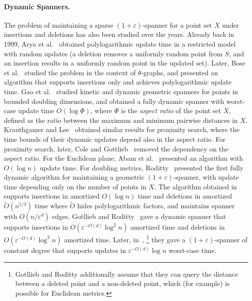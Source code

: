 \documentclass[11pt]{article}
\let\e\varepsilon               %
\def\EMPH#1{\emph{\textcolor{BrickRed} {#1}}}
\newcommand{\ddim}{\ensuremath{d}}
\begin{document}
\paragraph{Dynamic Spanners.} The problem of maintaining a sparse $(1+\e)$-spanner for a point set $X$ under insertions and deletions has also been studied over the years. Already back in 1999, Arya et al.~\cite{arya1999dynamic} obtained polylogarithmic update time in a restricted model with random updates
(a deletion removes a uniformly random point from $S$, and an insertion results in a uniformly random point in the updated set).
Later, Bose et al.~\cite{bose2004ordered} studied the problem in the context of $\theta$-graphs, and presented an algorithm that supports insertions only and achieves polylogarithmic update time. 
Gao et al.~\cite{gao2004deformable} studied kinetic and dynamic geometric spanners for points in bounded doubling dimensions, and obtained a fully dynamic spanner 
with worst-case update time $O(\log \Phi)$, where $\Phi$ is the 
\EMPH{aspect ratio} of the point set $X$, defined as the ratio between the maximum and minimum pairwise distances in $X$. Krauthgamer and Lee~\cite{KL04} obtained similar results for proximity search, where the time bounds of their dynamic updates depend also in the aspect ratio. For proximity search, later, Cole and Gottlieb~\cite{cole2006searching} removed the dependency on the aspect ratio. For the Euclidean plane, Abam et al.~\cite{abam2008simple} presented an algorithm with $O(\log n)$ update time. 
For doubling metrics, Roditty~\cite{roditty2012fully} presented the first fully dynamic algorithm for maintaining a geometric $(1+\varepsilon)$-spanner, with update time depending only on the number of points in $X$. The algorithm obtained in~\cite{roditty2012fully} supports insertions in amortized $O(\log n)$ time and deletions in amortized $\tilde{O}(n^{1/3})$ time
where $\tilde{O}$ hides polylogarithmic factors, 
and maintains spanner with $O(n / \varepsilon^{\ddim})$ edges.
Gotllieb and Roditty~\cite{GottliebR08}
gave a dynamic spanner that supports insertions in \(O\!\left(\varepsilon^{-O(\ddim)} \log^{2} n\right)\) amortized time and deletions in \(O\!\left(\varepsilon^{-O(\ddim)} \log^{3} n\right)\) amortized time.
Later, in~\cite{gottlieb2008optimal},
\footnote{Gotllieb and Roditty \cite{gottlieb2008optimal} additionally assume that they can query the distance between a deleted point and a non-deleted point, which (for example) is possible for Euclidean metrics.}
they gave a \((1+\varepsilon)\)-spanner of constant degree that supports updates in $\varepsilon^{-O(\ddim)} \log n$ worst-case time.
\end{document}
